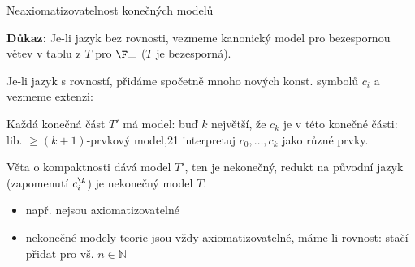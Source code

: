 \documentclass{beamer}
\begin{document}
\begin{frame}{Neaxiomatizovatelnost konečných modelů}

    \smallskip

    \pause

    \pause
    \textbf{Důkaz:} \pause
    \alert{Je-li jazyk bez rovnosti,} vezmeme  kanonický model pro bezespornou větev v tablu z $T$ pro $\F\bot$ ($T$ je bezesporná).
    
    \pause
    \alert{Je-li jazyk s rovností,} přidáme spočetně mnoho nových konst. symbolů $c_i$ a vezmeme extenzi: 

    \vspace{-2pt}

    \pause
    Každá \alert{konečná část} $T'$ má model: buď $k$ největší, že $c_k$ je v této konečné části: lib. $\geq(k+1)$-prvkový model,21 interpretuj $c_0,\dots,c_k$ jako různé prvky.

    \vspace{-2pt}

    \pause
    \alert{Věta o kompaktnosti} dává model $T'$, ten je nekonečný, redukt na původní jazyk (zapomenutí $c_i^\A$) je nekonečný model $T$.\hfill\qedsymbol

    \pause
    \begin{itemize}
        \item např.  nejsou axiomatizovatelné\pause
        \item \alert{nekonečné modely} teorie jsou vždy axiomatizovatelné, máme-li rovnost: stačí přidat  pro vš. $n\in\mathbb N$
    \end{itemize}

\end{frame}
\end{document}
